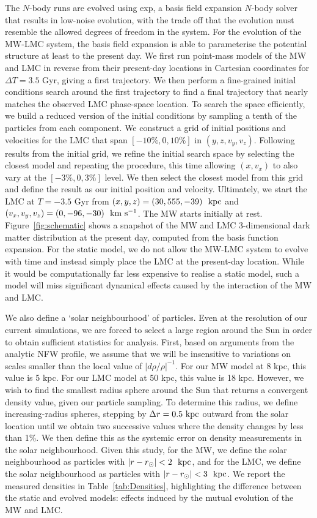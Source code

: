 \documentclass[fleqn,usenatbib]{mnras}
\newcommand{\kms}{{\rm ~km~s^{-1}}}	%
\newcommand{\kpc}{{\rm ~kpc}}	%
\begin{document}
The $N$-body runs are evolved using {\sc exp}, a basis field expansion $N$-body solver \citep{Weinberg..1999,Petersen..EXP..2021} that results in low-noise evolution, with the trade off that the evolution must resemble the allowed degrees of freedom in the system. For the evolution of the MW-LMC system, the basis field expansion is able to parameterise the potential structure at least to the present day. We first run point-mass models of the MW and LMC in reverse from their present-day locations in Cartesian coordinates for $\Delta T=3.5$ Gyr, giving a first trajectory. We then perform a fine-grained initial conditions search around the first trajectory to find a final trajectory that nearly matches the observed LMC phase-space location.  To search the space efficiently, we build a reduced version of the initial conditions by sampling a tenth of the particles from each component. We construct a grid of initial positions and velocities for the LMC that span $[-10\%,0,10\%]$ in $(y,z,v_y,v_z)$. Following results from the initial grid, we refine the initial search space by selecting the closest model and repeating the procedure, this time allowing $(x,v_x)$ to also vary at the $[-3\%,0,3\%]$ level. We then select the closest model from this grid and define the result as our initial position and velocity. Ultimately, we start the LMC at $T=-3.5$ Gyr from $(x,y,z)=(30, 555, -39)~\kpc$ and $(v_x,v_y,v_z)=(0, -96, -30)~\kms$. The MW starts initially at rest. Figure~\ref{fig:schematic} shows a snapshot of the MW and LMC 3-dimensional dark matter distribution at the present day, computed from the basis function expansion. For the static model, we do not allow the MW-LMC system to evolve with time and instead simply place the LMC at the present-day location. While it would be computationally far less expensive to realise a static model, such a model will miss significant dynamical effects caused by the interaction of the MW and LMC. 

We also define a `solar neighbourhood' of particles. Even at the resolution of our current simulations, we are forced to select a large region around the Sun in order to obtain sufficient statistics for analysis. First, based on arguments from the analytic NFW profile, we assume that we will be insensitive to variations on scales smaller than the local value of $|d\rho/\rho|^{-1}$. For our MW model at 8 kpc, this value is 5 kpc. For our LMC model at 50 kpc, this value is 18 kpc. However, we wish to find the smallest radius sphere around the Sun that returns a convergent density value, given our particle sampling. To determine this radius, we define increasing-radius spheres, stepping by $\Delta r=0.5\kpc$ outward from the solar location until we obtain two successive values where the density changes by less than 1\%. We then define this as the systemic error on density measurements in the solar neighbourhood.
Given this study, for the MW, we define the solar neighbourhood as particles with $|r - r_\odot|<2~\kpc$, and for the LMC, we define the solar neighbourhood as particles with $|r - r_\odot|<3~\kpc$. We report the measured densities in Table~\ref{tab:Densities}, highlighting the difference between the static and evolved models: effects induced by the mutual evolution of the MW and LMC.
 
\end{document}
